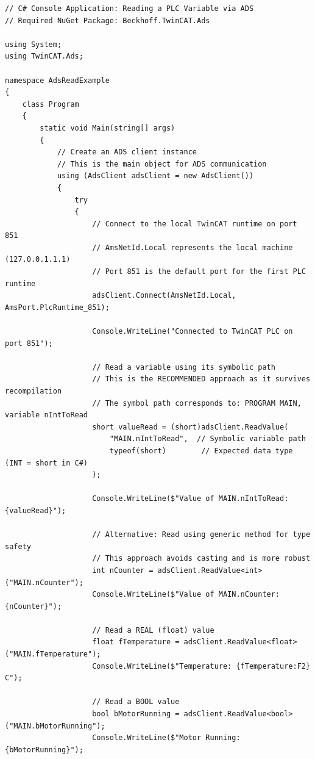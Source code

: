 \documentclass[11pt,a4paper]{article}
\begin{document}
\begin{lstlisting}[style=csharpstyle]
// C# Console Application: Reading a PLC Variable via ADS
// Required NuGet Package: Beckhoff.TwinCAT.Ads

using System;
using TwinCAT.Ads;

namespace AdsReadExample
{
    class Program
    {
        static void Main(string[] args)
        {
            // Create an ADS client instance
            // This is the main object for ADS communication
            using (AdsClient adsClient = new AdsClient())
            {
                try
                {
                    // Connect to the local TwinCAT runtime on port 851
                    // AmsNetId.Local represents the local machine (127.0.0.1.1.1)
                    // Port 851 is the default port for the first PLC runtime
                    adsClient.Connect(AmsNetId.Local, AmsPort.PlcRuntime_851);
                    
                    Console.WriteLine("Connected to TwinCAT PLC on port 851");
                    
                    // Read a variable using its symbolic path
                    // This is the RECOMMENDED approach as it survives recompilation
                    // The symbol path corresponds to: PROGRAM MAIN, variable nIntToRead
                    short valueRead = (short)adsClient.ReadValue(
                        "MAIN.nIntToRead",  // Symbolic variable path
                        typeof(short)        // Expected data type (INT = short in C#)
                    );
                    
                    Console.WriteLine($"Value of MAIN.nIntToRead: {valueRead}");
                    
                    // Alternative: Read using generic method for type safety
                    // This approach avoids casting and is more robust
                    int nCounter = adsClient.ReadValue<int>("MAIN.nCounter");
                    Console.WriteLine($"Value of MAIN.nCounter: {nCounter}");
                    
                    // Read a REAL (float) value
                    float fTemperature = adsClient.ReadValue<float>("MAIN.fTemperature");
                    Console.WriteLine($"Temperature: {fTemperature:F2} C");
                    
                    // Read a BOOL value
                    bool bMotorRunning = adsClient.ReadValue<bool>("MAIN.bMotorRunning");
                    Console.WriteLine($"Motor Running: {bMotorRunning}");
                    

\end{lstlisting}
\end{document}
